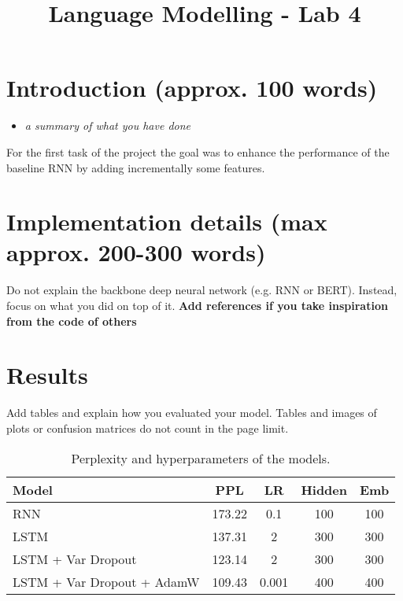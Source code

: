 \documentclass[a4paper]{article}
\title{Language Modelling - Lab 4}
\begin{document}
\maketitle
%
%
\section{Introduction (approx. 100 words)}
\begin{itemize}
    \item \textit{a summary of what you have done}
\end{itemize}
For the first task of the project the goal was to enhance the performance of the baseline RNN by 
adding incrementally some features.
\section{Implementation details (max approx. 200-300 words)}
Do not explain the backbone deep neural network (e.g. RNN or BERT). Instead, focus on what you did on top of it. \textbf{Add references if you take inspiration from the code of others}

\section{Results}
Add tables and explain how you evaluated your model. Tables and images of plots or confusion matrices do not count in the page limit.
\begin{table}[h!]
  \centering
  \begin{tabular}{lcccc}
      \toprule
      Model & PPL & LR & Hidden & Emb \\
      \midrule
      RNN                     & 173.22 & 0.1    & 100 & 100 \\
      LSTM                    & 137.31 & 2      & 300 & 300 \\
      LSTM + Var Dropout      & 123.14 & 2      & 300 & 300 \\
      LSTM + Var Dropout + AdamW & 109.43 & 0.001 & 400 & 400 \\
      \bottomrule
  \end{tabular}
  \caption{Perplexity and hyperparameters of the models.}
  \label{tab:results}
\end{table}





\cite{Rabiner89-ATO}
\end{document}
